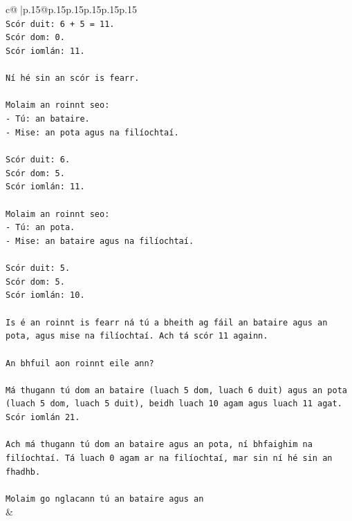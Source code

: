 \documentclass{article}
\begin{document}
{\begin{supertabular}{c@{$\;$}|p{.15\linewidth}@{}p{.15\linewidth}p{.15\linewidth}p{.15\linewidth}p{.15\linewidth}p{.15\linewidth}}
{{{\\ 
\texttt{Scór duit: 6 + 5 = 11.} \\
\texttt{Scór dom: 0.} \\
\texttt{Scór iomlán: 11.} \\
\\ 
\texttt{Ní hé sin an scór is fearr.} \\
\\ 
\texttt{Molaim an roinnt seo:} \\
\texttt{{-} Tú: an bataire.} \\
\texttt{{-} Mise: an pota agus na filíochtaí.} \\
\\ 
\texttt{Scór duit: 6.} \\
\texttt{Scór dom: 5.} \\
\texttt{Scór iomlán: 11.} \\
\\ 
\texttt{Molaim an roinnt seo:} \\
\texttt{{-} Tú: an pota.} \\
\texttt{{-} Mise: an bataire agus na filíochtaí.} \\
\\ 
\texttt{Scór duit: 5.} \\
\texttt{Scór dom: 5.} \\
\texttt{Scór iomlán: 10.} \\
\\ 
\texttt{Is é an roinnt is fearr ná tú a bheith ag fáil an bataire agus an pota, agus mise na filíochtaí. Ach tá scór 11 againn.} \\
\\ 
\texttt{An bhfuil aon roinnt eile ann?} \\
\\ 
\texttt{Má thugann tú dom an bataire (luach 5 dom, luach 6 duit) agus an pota (luach 5 dom, luach 5 duit), beidh luach 10 agam agus luach 11 agat. Scór iomlán 21.} \\
\\ 
\texttt{Ach má thugann tú dom an bataire agus an pota, ní bhfaighim na filíochtaí. Tá luach 0 agam ar na filíochtaí, mar sin ní hé sin an fhadhb.} \\
\\ 
\texttt{Molaim go nglacann tú an bataire agus an} \\
            }
        }
    }
    & \\ \\


\end{supertabular}}
\end{document}
